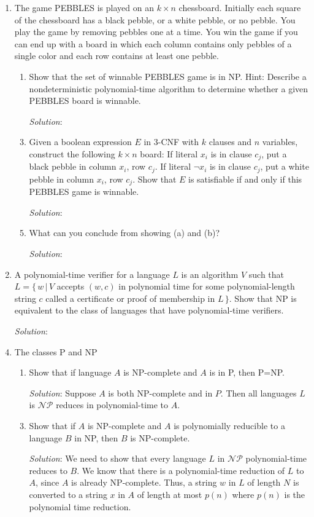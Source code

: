 \documentclass[]{article}
\begin{document}
\begin{enumerate}
\begin{enumerate}
\end{enumerate}

\item The game PEBBLES is played on an $k \times n$ chessboard. Initially each
square of the chessboard has a black pebble, or a white pebble, or no pebble.
You play the game by removing pebbles one at a time. You win the game if you can
end up with a board in which each column contains only pebbles of a single color
and each row contains at least one pebble.
\begin{enumerate}
\item Show that the set of winnable PEBBLES game is in NP. Hint: Describe a
nondeterministic polynomial-time algorithm to  determine whether a given PEBBLES
board is winnable.
\item[\emph{Solution}:]

\item Given a boolean expression $E$ in 3-CNF with $k$ clauses and $n$
variables, construct the following $k \times n$ board: If literal $x_i$ is in
clause $c_j$, put a black pebble in column $x_i$, row $c_j$. If literal $\neg
x_i$ is in clause $c_j$, put a white pebble in column $x_i$, row $c_j$. Show
that $E$ is satisfiable if and only if this PEBBLES game is winnable.
\item[\emph{Solution}:]

\item What can you conclude from showing (a) and (b)?
\item[\emph{Solution}:]
\end{enumerate}

\item A polynomial-time verifier for a language $L$ is an algorithm $V$ such
that $L = \{\,w\,|\,V$ accepts $(w,c)$ in polynomial time for some
polynomial-length string $c$ called a certificate or proof of membership in
$L\,\}$. Show that NP is equivalent to the class of languages that have
polynomial-time verifiers.
\item[\emph{Solution}:]

\item The classes P and NP
\begin{enumerate}
\item Show that if language $A$ is NP-complete and $A$ is in P, then P=NP.
\item[\emph{Solution}:] Suppose $A$ is both NP-complete and in $P$. Then all
languages $L$ is $\mathcal{NP}$ reduces in polynomial-time to $A$.

\item Show that if $A$ is NP-complete and $A$ is polynomially reducible to a
language $B$ in NP, then $B$ is NP-complete.
\item[\emph{Solution}:] We need to show that every language $L$ in
$\mathcal{NP}$ polynomial-time reduces to $B$. We know that there is a
polynomial-time reduction of $L$ to $A$, since $A$ is already NP-complete. Thus,
a string $w$ in $L$ of length $N$ is converted to a string $x$ in $A$ of length
at most $p(n)$ where $p(n)$ is the polynomial time reduction.


\end{enumerate}
\end{enumerate}
\end{document}

